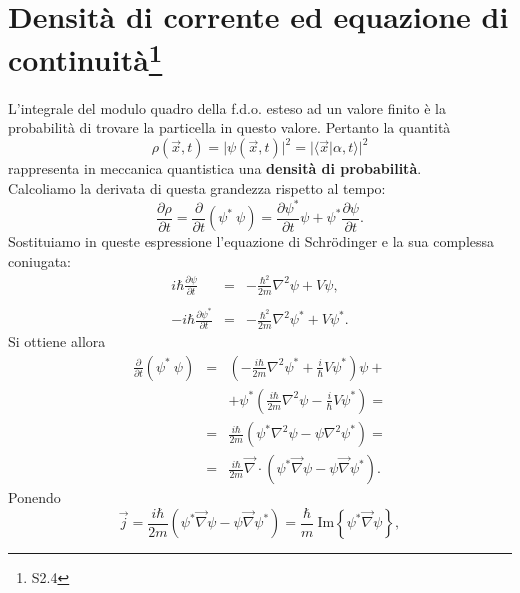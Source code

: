 \section[Densità di corrente ed equazione di continuità]{Densità di corrente ed equazione di continuità\footnote{S2.4}}
L'integrale del modulo quadro della f.d.o. esteso ad un valore finito è la probabilità di trovare la particella in questo valore. Pertanto la quantità
\begin{equation}
\rho (\vec{x}, t) = \vert \psi (\vec{x},t) \vert ^2 = \vert \langle \vec{x}\vert \alpha, t \rangle \vert ^2
\end{equation}
rappresenta in meccanica quantistica una \textbf{densità di probabilità}.\\
Calcoliamo la derivata di questa grandezza rispetto al tempo:
\begin{equation}
\frac{\partial \rho}{\partial t} = \frac{\partial }{\partial t}\left( \psi^*\ \psi \right) = \frac{\partial \psi ^*}{\partial t}\psi + \psi^*\frac{\partial \psi}{\partial t}.
\end{equation}
Sostituiamo in queste espressione l'equazione di Schr\"{o}dinger e la sua complessa coniugata:
\begin{eqnarray}
 i\hbar \frac{\partial \psi}{\partial t} &=& -\frac{\hbar ^2}{2m} \nabla ^ 2 \psi + V \psi ,\nonumber \\
\\
 -i\hbar \frac{\partial \psi ^*}{\partial t} &=& -\frac{\hbar ^2}{2m} \nabla ^ 2 \psi ^* + V \psi ^* .\nonumber
\end{eqnarray}
Si ottiene allora
\begin{eqnarray}
\frac{\partial }{\partial t}\left(\psi^*\ \psi \right) & = & \left(-\frac{i\hbar}{2m}\nabla ^2 \psi ^* +\frac{i}{\hbar}V\psi ^*\right)\psi + \nonumber \\
& &+\psi ^* \left(\frac{i\hbar}{2m}\nabla ^2 \psi -\frac{i}{\hbar}V\psi ^*\right)=\\
&=& \frac{i\hbar}{2m}\left(\psi ^* \nabla ^2 \psi - \psi \nabla ^2 \psi ^* \right) = \nonumber \\
&=& \frac{i\hbar}{2m} \vec{\nabla}\cdot \left(\psi ^* \vec{\nabla} \psi - \psi \vec{\nabla} \psi ^* \right). \nonumber
\end{eqnarray}
Ponendo
\begin{equation}
\vec{j}=\frac{i\hbar}{2m} \left(\psi ^* \vec{\nabla} \psi - \psi \vec{\nabla} \psi ^* \right)= \frac{\hbar}{m}\ \textrm{Im}\left\{\psi ^* \vec{\nabla}\psi \right\},
\end{equation}
